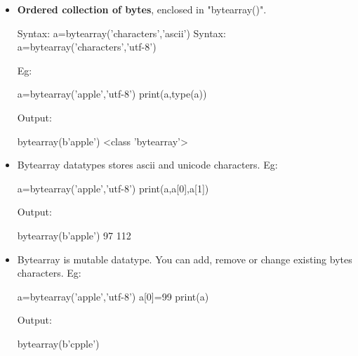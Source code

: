 
\begin{flushleft}
	\begin{itemize}
		\item \textbf{Ordered collection of bytes}, enclosed in "bytearray()".
		\begin{tcolorbox}[breakable,notitle,boxrule=1pt,colback=pink,colframe=pink]
			\color{black}
			\font=8pt
			Syntax: a=bytearray('characters','ascii')
			\newline
			Syntax: a=bytearray('characters','utf-8')
			\font=4pt
		\end{tcolorbox}
		
		Eg:	
		\begin{tcolorbox}[breakable,notitle,boxrule=-0pt,colback=code,colframe=code]
			\color{white}
			\font=8pt
			a=bytearray('apple','utf-8') \newline
			print(a,type(a))
			\font=4pt
		\end{tcolorbox}
		
		Output:
		\begin{tcolorbox}[breakable,notitle,boxrule=-0pt,colback=output,colframe=output]
			\color{black}
			bytearray(b'apple') <class 'bytearray'>
			\font=4pt
		\end{tcolorbox}
		
		\item Bytearray datatypes stores ascii and unicode characters.
		\newline
		Eg:			
		\begin{tcolorbox}[breakable,notitle,boxrule=-0pt,colback=code,colframe=code]
			\color{white}
			\font=8pt
			a=bytearray('apple','utf-8') \newline
			print(a,a[0],a[1])
			\font=4pt
		\end{tcolorbox}

		Output:
		\begin{tcolorbox}[breakable,notitle,boxrule=-0pt,colback=output,colframe=output]
			\color{black}
			bytearray(b'apple') 97 112
			\font=4pt
		\end{tcolorbox}
		
		\item Bytearray is mutable datatype. You can add, remove or change existing bytes characters.
		\newline
		Eg:			
		\begin{tcolorbox}[breakable,notitle,boxrule=-0pt,colback=code,colframe=code]
			\color{white}
			\font=8pt
			a=bytearray('apple','utf-8') \newline
			a[0]=99 \newline
			print(a)
			\font=4pt
		\end{tcolorbox}
		
		Output:
		\begin{tcolorbox}[breakable,notitle,boxrule=-0pt,colback=output,colframe=output]
			\color{black}
			bytearray(b'cpple')
			\font=4pt
		\end{tcolorbox}
		
	\end{itemize}
	
\end{flushleft}

\newpage

